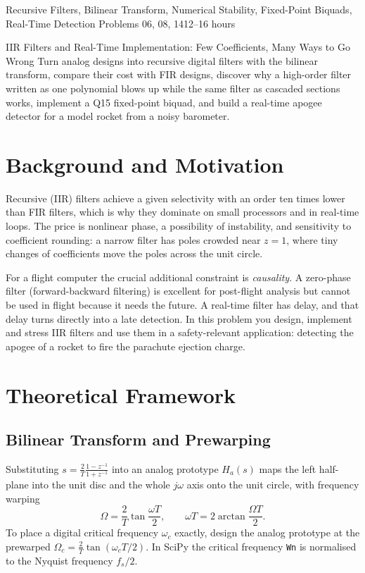 \documentclass[11pt,a4paper]{article}
\begin{document}
%
{Recursive Filters, Bilinear Transform, Numerical Stability, Fixed-Point Biquads, Real-Time Detection}%
{Problems 06, 08, 14}{12--16 hours}

\begin{summarybox}{IIR Filters and Real-Time Implementation: Few Coefficients, Many Ways to Go Wrong}
Turn analog designs into recursive digital filters with the bilinear transform, compare their cost with FIR designs, discover why a high-order filter written as one polynomial blows up while the same filter as cascaded sections works, implement a Q15 fixed-point biquad, and build a real-time apogee detector for a model rocket from a noisy barometer.
\end{summarybox}


\section*{Background and Motivation}
Recursive (IIR) filters achieve a given selectivity with an order ten times lower than FIR filters, which is why they dominate on small processors and in real-time loops. The price is nonlinear phase, a possibility of instability, and sensitivity to coefficient rounding: a narrow filter has poles crowded near $z=1$, where tiny changes of coefficients move the poles across the unit circle.

For a flight computer the crucial additional constraint is \emph{causality}. A zero-phase filter (forward-backward filtering) is excellent for post-flight analysis but cannot be used in flight because it needs the future. A real-time filter has delay, and that delay turns directly into a late detection. In this problem you design, implement and stress IIR filters and use them in a safety-relevant application: detecting the apogee of a rocket to fire the parachute ejection charge.

\section*{Theoretical Framework}
\subsection{Bilinear Transform and Prewarping}
Substituting $s=\frac2T\frac{1-z^{-1}}{1+z^{-1}}$ into an analog prototype $H_a(s)$ maps the left half-plane into the unit disc and the whole $j\omega$ axis onto the unit circle, with frequency warping
\begin{equation}
  \Omega=\frac2T\tan\frac{\omega T}{2},\qquad \omega T=2\arctan\frac{\Omega T}{2}.
  \label{eq:warp}
\end{equation}
To place a digital critical frequency $\omega_c$ exactly, design the analog prototype at the prewarped $\Omega_c=\frac2T\tan(\omega_cT/2)$. In SciPy the critical frequency \texttt{Wn} is normalised to the Nyquist frequency $f_s/2$.
\end{document}
